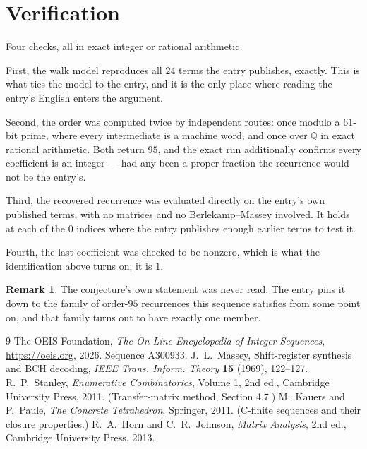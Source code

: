 \documentclass[11pt,a4paper]{article}
\theoremstyle{plain}
\theoremstyle{definition}
\newtheorem{remark}[theorem]{Remark}
\begin{document}
\section{Verification}

Four checks, all in exact integer or rational arithmetic.

First, the walk model reproduces all $24$ terms the entry publishes, exactly. This is
what ties the model to the entry, and it is the only place where reading the entry's English
enters the argument.

Second, the order was computed twice by independent routes: once modulo a $61$-bit prime, where
every intermediate is a machine word, and once over $\mathbb{Q}$ in exact rational arithmetic.
Both return $95$, and the exact run additionally confirms every coefficient is an integer
--- had any been a proper fraction the recurrence would not be the entry's.

Third, the recovered recurrence was evaluated directly on the entry's own published terms, with
no matrices and no Berlekamp--Massey involved. It holds at each of the $0$ indices where
the entry publishes enough earlier terms to test it.

Fourth, the last coefficient was checked to be nonzero, which is what the identification above
turns on; it is $1$.

\begin{remark}
The conjecture's own statement was never read. The entry pins it down to the family of
order-$95$ recurrences this sequence satisfies from some point on, and that family turns
out to have exactly one member.
\end{remark}

\begin{thebibliography}{9}
 The OEIS Foundation, \emph{The On-Line Encyclopedia of Integer
Sequences}, \url{https://oeis.org}, 2026. Sequence A300933.
 J.~L.~Massey, Shift-register synthesis and BCH decoding, \emph{IEEE
Trans. Inform. Theory} \textbf{15} (1969), 122--127.
 R.~P.~Stanley, \emph{Enumerative Combinatorics}, Volume 1, 2nd ed.,
Cambridge University Press, 2011. (Transfer-matrix method, Section 4.7.)
 M.~Kauers and P.~Paule, \emph{The Concrete Tetrahedron}, Springer, 2011.
(C-finite sequences and their closure properties.)
 R.~A.~Horn and C.~R.~Johnson, \emph{Matrix Analysis}, 2nd ed., Cambridge
University Press, 2013.
\end{thebibliography}
\end{document}
